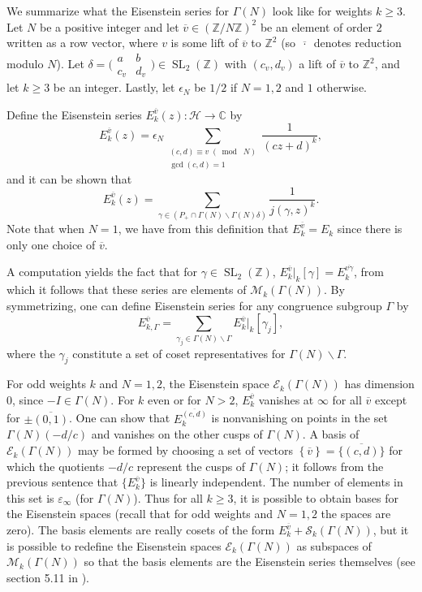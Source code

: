 \documentclass[10pt,leqno,twoside]{article}
\theoremstyle{plain}
\theoremstyle{definition}
\numberwithin{equation}{section}
\numberwithin{lem}{section}
\newcommand{\cbr}[1]{\left\{#1\right\}}
\DeclareMathOperator{\SL}{SL}
\newcommand{\smod}[1]{\;(\bmod\; #1)}
\newcommand{\slz}{\SL_2(\mathbb{Z})}
\begin{document}
We summarize what the Eisenstein series for $\varGamma(N)$ look like for weights $k\geq 3$. Let $N$ be a positive integer and let $\overline v \in (\mathbb Z/N\mathbb Z)^2$ be an element of order $2$ written as a row vector, where $v$ is some lift of $\overline v$ to $\mathbb Z^2$ (so $\overline{\,\cdot\,}$ denotes reduction modulo $N$). Let $\delta = \big(\!\begin{smallmatrix}
    a & b \\ c_v & d_v
\end{smallmatrix}\!\big)\in\slz$ with $(c_v,d_v)$ a lift of $\overline v$ to $\mathbb Z^2$, and let $k\geq 3$ be an integer. Lastly, let $\epsilon_N$ be $1/2$ if $N=1,2$ and $1$ otherwise. 

Define the Eisenstein series $E_k^{\overline v}(z)\colon\mathcal H\to\mathbb C$ by \[E_k^{\overline v}(z) =\epsilon_N\sum_{\substack{(c,d)\equiv v\smod N\\\gcd(c,d) = 1}}\frac{1}{(cz+d)^k},\] and it can be shown that \[E_k^{\overline v}(z) = \sum_{\gamma \in(P_+\cap \varGamma(N)\backslash \varGamma(N)\delta)}\frac{1}{j(\gamma,z)^k}.\] Note that when $N = 1$, we have from this definition that $E_k^{\overline v} = E_k$ since there is only one choice of $\overline v$.

A computation yields the fact that for $\gamma\in\slz$, $E_k^{\overline v}|_k[\gamma] = E_k^{\overline{v\gamma}}$, from which it follows that these series are elements of $\mathcal M_k(\varGamma(N))$. By symmetrizing, one can define Eisenstein series for any congruence subgroup $\varGamma$ by
\[E_{k,\varGamma}^{\overline v} = \sum_{\gamma_j\in\varGamma(N)\backslash \varGamma}E_k^{\overline v}|_k[\gamma_j],\] where the $\gamma_j$ constitute a set of coset representatives for $\varGamma(N)\backslash \varGamma$.

For odd weights $k$ and $N = 1,2$, the Eisenstein space $\mathcal E_k(\varGamma(N))$ has dimension $0$, since $-I\in\varGamma(N)$. For $k$ even or for $N>2$, $E_k^{\overline v}$ vanishes at $\infty$ for all $\overline v$ except for $\pm\overline{(0,1)}$. One can show that $E_k^{\overline{(c,d)}}$ is nonvanishing on points in the set $\varGamma(N)(-d/c)$ and vanishes on the other cusps of $\varGamma(N)$. A basis of $\mathcal E_k(\varGamma(N))$ may be formed by choosing a set of vectors $\cbr{\overline v} = \{\overline{(c,d)}\}$ for which the quotients $-d/c$ represent the cusps of $\varGamma(N)$; it follows from the previous sentence that $\{E_k^{\overline v}\}$ is linearly independent. The number of elements in this set is $\varepsilon_\infty$ (for $\varGamma(N)$). Thus for all $k\geq 3$, it is possible to obtain bases for the Eisenstein spaces (recall that for odd weights and $N = 1,2$ the spaces are zero). The basis elements are really cosets of the form $E_k^{\overline v} + \mathcal S_k(\varGamma(N))$, but it is possible to redefine the Eisenstein spaces $\mathcal E_k(\varGamma(N))$ as subspaces of $\mathcal M_k(\varGamma(N))$ so that the basis elements are the Eisenstein series themselves (see section 5.11 in \cite{diamond}).
\end{document}
